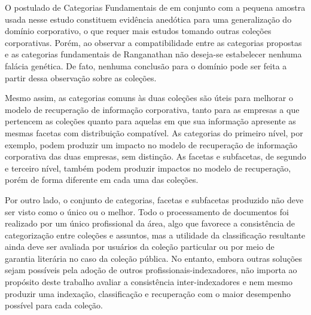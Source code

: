 O postulado de Categorias Fundamentais de  em conjunto com a pequena amostra usada nesse estudo constituem evidência anedótica para uma generalização do domínio corporativo, o que requer mais estudos tomando outras coleções corporativas. Porém, ao observar a compatibilidade entre as categorias propostas e as categorias fundamentais de Ranganathan não deseja-se estabelecer nenhuma falácia genética. De fato, nenhuma conclusão para o domínio pode ser feita a partir dessa observação sobre as coleções.

Mesmo assim, as categorias comuns às duas coleções são úteis para melhorar o modelo de recuperação de informação corporativa, tanto para as empresas a que pertencem as coleções quanto para aquelas em que sua informação apresente as mesmas facetas com distribuição compatível. As categorias do primeiro nível, por exemplo, podem produzir um impacto no modelo de recuperação de informação corporativa das duas empresas, sem distinção. As facetas e subfacetas, de segundo e terceiro nível, também podem produzir impactos no modelo de recuperação, porém de forma diferente em cada uma das coleções. %

Por outro lado, o conjunto de categorias, facetas e subfacetas produzido não deve ser visto como o único ou o melhor. Todo o processamento de documentos foi realizado por um único profissional da área, algo que favorece a consistência de categorização entre coleções e assuntos, mas a utilidade da classificação resultante ainda deve ser avaliada por usuários da coleção particular ou por meio de garantia literária no caso da coleção pública. No entanto, embora outras soluções sejam possíveis pela adoção de outros profissionais-indexadores, não importa ao propósito deste trabalho avaliar a consistência inter-indexadores e nem mesmo produzir uma indexação, classificação e recuperação com o maior desempenho possível para cada coleção.
















